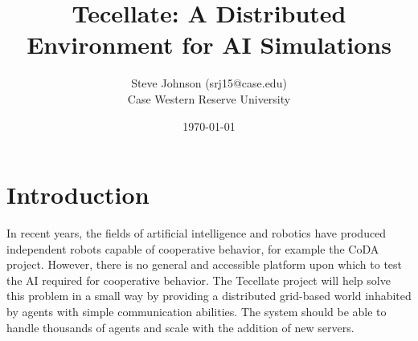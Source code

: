 \documentclass[12pt]{article}
\title{Tecellate: A Distributed Environment for AI Simulations}
\author{
        Steve Johnson (srj15@case.edu)\\
        Case Western Reserve University\\
}
\date{\today}
\begin{document}
\doublespacing
\maketitle


\section{Introduction}

In recent years, the fields of artificial intelligence and robotics have produced independent robots capable of cooperative behavior, for example the CoDA project\cite{CoDA}. However, there is no general and accessible platform upon which to test the AI required for cooperative behavior. The Tecellate project will help solve this problem in a small way by providing a distributed grid-based world inhabited by agents with simple communication abilities. The system should be able to handle thousands of agents and scale with the addition of new servers.









\end{document}
